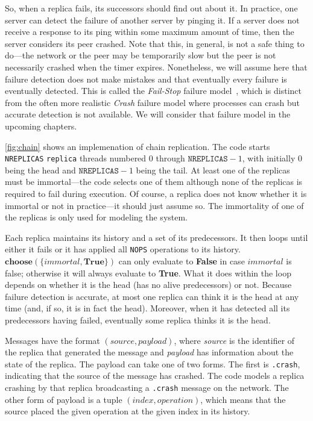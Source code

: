 \documentclass{report}
\begin{document}
So, when a replica fails, its successors should find out about it.
In practice, one server can detect the failure of another server by
pinging it.  If a server does not receive a response to its ping within
some maximum amount of time, then the server considers its peer crashed.
Note that this, in general, is not a safe thing to do---the network or
the peer may be temporarily slow but the peer is not necessarily crashed
when the timer expires.
Nonetheless, we will assume here that failure detection does not make
mistakes and that eventually every failure is eventually detected.
This is called the \emph{Fail-Stop} failure model~\cite{SS83},
which is distinct from the often more realistic \emph{Crash} failure model
where processes can crash but accurate detection is not available.
We will consider that failure model in the upcoming chapters.

\autoref{fig:chain} shows an implemenation of chain replication.
The code starts \texttt{NREPLICAS} \texttt{replica} threads numbered
0 through $\mathtt{NREPLICAS} - 1$, with initially 0 being the head
and $\mathtt{NREPLICAS} - 1$ being the tail.  At least one of the replicas 
must be immortal---the code selects one of them although none of the
replicas is required to fail during execution.
Of course, a replica does not know whether it is immortal
or not in practice---it should just assume so.
The immortality of one of the replicas is only used for modeling the system.

Each replica maintains its history and a set of its predecessors.
It then loops until either it fails or it has applied all
\texttt{NOPS} operations to its history.
$\mathbf{choose}(\{ \mathit{immortal}, \textbf{True} \})$ can only
evaluate to \textbf{False} in case $\textit{immortal}$ is false; otherwise
it will always evaluate to \textbf{True}.
What it does within the loop depends on whether it is the head
(has no alive predecessors) or not.
Because failure detection is accurate, at most one replica can think
it is the head at any time (and, if so, it is in fact the head).
Moreover, when it has
detected all its predecessors having failed, eventually some replica
thinks it is the head.

Messages have the format $(\mathit{source}, \mathit{payload})$,
where \textit{source} is the identifier of the replica that generated
the message and \textit{payload} has information about the state of
the replica.  The payload can take one of two forms.  The first is
\texttt{.crash}, indicating that the source of the message has
crashed.  The code models a replica crashing by that replica broadcasting
a \texttt{.crash} message on the network.
The other form of payload is a tuple
$(\mathit{index}, \mathit{operation})$, which means that the source
placed the given operation at the given index in its history.
\end{document}
